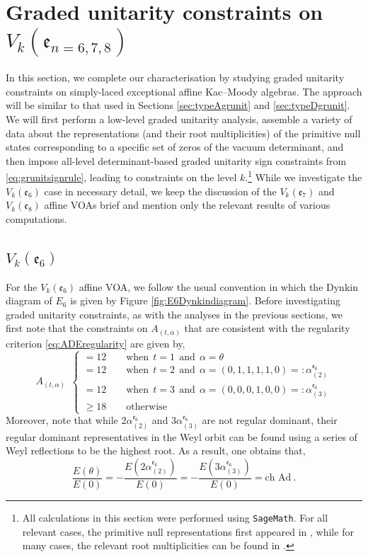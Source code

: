 \section{Graded unitarity constraints on $V_k(\mathfrak{e}_{n=6,7,8})$} \label{sec:typeEgrunit}
In this section, we complete our characterisation by studying graded unitarity constraints on simply-laced exceptional affine Kac--Moody algebras. The approach will be similar to that used in Sections \ref{sec:typeAgrunit} and \ref{sec:typeDgrunit}. We will first perform a low-level graded unitarity analysis, assemble a variety of data about the representations (and their root multiplicities) of the primitive null states corresponding to a specific set of zeros of the vacuum determinant, and then impose all-level determinant-based graded unitarity sign constraints from \eqref{eq:grunitsignrule}, leading to constraints on the level $k$.\footnote{All calculations in this section were performed using \texttt{SageMath}. For all relevant cases, the primitive null representations first appeared in \cite{jiang2025singular}, while for many cases, the relevant root multiplicities can be found in \cite{Lübeck_2001}.} While we investigate the $V_k(\mathfrak{e}_6)$ case in necessary detail, we keep the discussion of the $V_k(\mathfrak{e}_7)$ and $V_k(\mathfrak{e}_8)$ affine VOAs brief and mention only the relevant results of various computations.

\subsection{$V_k(\mathfrak{e}_6)$}

For the $V_k(\mathfrak{e}_6)$ affine VOA, we follow the usual convention in which the Dynkin diagram of $E_6$ is given by Figure \ref{fig:E6Dynkindiagram}. Before investigating graded unitarity constraints, as with the analyses in the previous sections, we first note that the constraints on $A_{(t,\alpha)}$ that are consistent with the regularity criterion \eqref{eq:ADEregularity} are given by,
\begin{equation} \label{eq:Atconste6}
    A_{(t,\alpha)} \ \ \begin{cases}
        = 12 \qquad \text{when} \ \ t = 1 \ \ \text{and} \ \ \alpha = \theta \\ = 12 \qquad \text{when} \ \ t = 2 \ \ \text{and} \ \ \alpha = (0,1,1,1,1,0) =: \alpha^{\mathfrak{e}_6}_{(2)} \\ = 12 \qquad \text{when} \ \ t = 3 \ \ \text{and} \ \ \alpha = (0,0,0,1,0,0) =: \alpha^{\mathfrak{e}_6}_{(3)} \\ \geqslant 18 \qquad \text{otherwise}
    \end{cases}
\end{equation}
Moreover, note that while $2\alpha^{\mathfrak{e}_6}_{(2)}$ and $3\alpha^{\mathfrak{e}_6}_{(3)}$ are not regular dominant, their regular dominant representatives in the Weyl orbit can be found using a series of Weyl reflections to be the highest root. As a result, one obtains that, 
\begin{equation}
    \frac{E(\theta)}{E(0)} = -\frac{E(2\alpha^{\mathfrak{e}_6}_{(2)})}{E(0)} = -\frac{E(3\alpha^{\mathfrak{e}_6}_{(3)})}{E(0)} = \text{ch Ad}~.
\end{equation}
